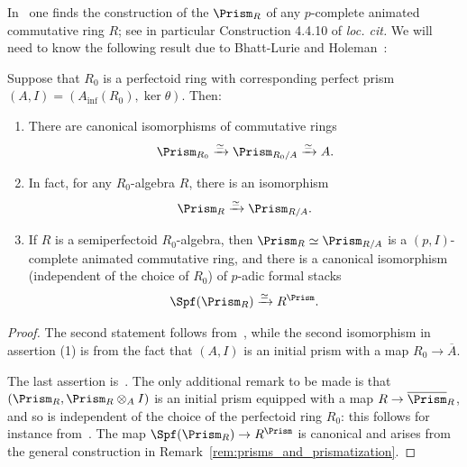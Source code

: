 \documentclass[10pt]{amsart}
\begin{document}
In~\cite[\S 4.4]{bhatt2022absolute} one finds the construction of the  $\Prism_R$ of any $p$-complete animated commutative ring $R$; see in particular Construction 4.4.10 of \emph{loc. cit.} We will need to know the following result due to Bhatt-Lurie and Holeman~\cite{holeman2023derived}:

\begin{theorem}
\label{thm:absolute_prismatic_cohom}
Suppose that $R_0$ is a perfectoid ring with corresponding perfect prism $(A,I) = (A_{\mathrm{inf}}(R_0),\ker\theta)$. Then:
\begin{enumerate}
   \item There are canonical isomorphisms of commutative rings
   \[
    \Prism_{R_0}\xrightarrow{\simeq}\Prism_{R_0/A}\xrightarrow{\simeq}A.
   \]
   \item In fact, for any $R_0$-algebra $R$, there is an isomorphism
   \[
    \Prism_R \xrightarrow{\simeq}\Prism_{R/A}.
   \]
   \item If $R$ is a semiperfectoid $R_0$-algebra, then $\Prism_{R}\simeq\Prism_{R/A}$ is a $(p,I)$-complete animated commutative ring, and there is a canonical isomorphism (independent of the choice of $R_0$) of $p$-adic formal stacks
   \[
   \Spf(\Prism_{R})\xrightarrow{\simeq}R^{\Prism}.
   \]
\end{enumerate}
\end{theorem}
\begin{proof}
The second statement follows from~\cite[Proposition 4.4.12]{bhatt2022absolute}, while the second isomorphism in assertion (1) is from the fact that $(A,I)$ is an initial prism with a map $R_0\to \overline{A}$. 

The last assertion is~\cite[Corollary 7.18]{bhatt2022prismatization}. The only additional remark to be made is that $(\Prism_R,\Prism_R\otimes_{A}I)$ is an initial prism equipped with a map $R\to \overline{\Prism}_R$, and so is independent of the choice of the perfectoid ring $R_0$: this follows for instance from~\cite[Theorem 3.3.7]{holeman2023derived}. The map $\Spf(\Prism_R)\to R^{\Prism}$ is canonical and arises from the general construction in Remark~\ref{rem:prisms_and_prismatization}.
\end{proof}
\end{document}
